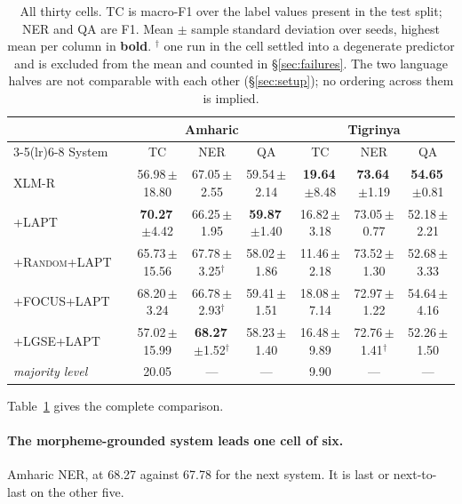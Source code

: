 \documentclass[11pt]{article}
\begin{document}
\begin{table}[t]
\centering
\small
\begin{tabular}{llcccccc}
\toprule
& & \multicolumn{3}{c}{\textbf{Amharic}} & \multicolumn{3}{c}{\textbf{Tigrinya}} \\
\cmidrule(lr){3-5}\cmidrule(lr){6-8}
System & & TC & NER & QA & TC & NER & QA \\
\midrule
XLM-R & & 56.98\,\small{$\pm$18.80} & 67.05\,\small{$\pm$2.55} & 59.54\,\small{$\pm$2.14} & \textbf{19.64}\,\small{$\pm$8.48} & \textbf{73.64}\,\small{$\pm$1.19} & \textbf{54.65}\,\small{$\pm$0.81} \\
\textsc{+LAPT} & & \textbf{70.27}\,\small{$\pm$4.42} & 66.25\,\small{$\pm$1.95} & \textbf{59.87}\,\small{$\pm$1.40} & 16.82\,\small{$\pm$3.18} & 73.05\,\small{$\pm$0.77} & 52.18\,\small{$\pm$2.21} \\
\textsc{+Random+LAPT} & & 65.73\,\small{$\pm$15.56} & 67.78\,\small{$\pm$3.25}$^\dagger$ & 58.02\,\small{$\pm$1.86} & 11.46\,\small{$\pm$2.18} & 73.52\,\small{$\pm$1.30} & 52.68\,\small{$\pm$3.33} \\
\textsc{+FOCUS+LAPT} & & 68.20\,\small{$\pm$3.24} & 66.78\,\small{$\pm$2.93}$^\dagger$ & 59.41\,\small{$\pm$1.51} & 18.08\,\small{$\pm$7.14} & 72.97\,\small{$\pm$1.22} & 54.64\,\small{$\pm$4.16} \\
\textsc{+LGSE+LAPT} & & 57.02\,\small{$\pm$15.99} & \textbf{68.27}\,\small{$\pm$1.52}$^\dagger$ & 58.23\,\small{$\pm$1.40} & 16.48\,\small{$\pm$9.89} & 72.76\,\small{$\pm$1.41}$^\dagger$ & 52.26\,\small{$\pm$1.50} \\
\midrule
\multicolumn{2}{l}{\emph{majority level}} & 20.05 & --- & --- & 9.90 & --- & --- \\
\bottomrule
\end{tabular}
\caption{All thirty cells. TC is macro-F1 over the label values present in
the test split; NER and QA are F1. Mean $\pm$ sample standard deviation over
seeds, highest mean per column in \textbf{bold}. $^\dagger$ one run in the
cell settled into a degenerate predictor and is excluded from the mean and
counted in \S\ref{sec:failures}. The two language halves are not comparable
with each other (\S\ref{sec:setup}); no ordering across them is implied.}
\label{tab:main}
\end{table}

Table~\ref{tab:main} gives the complete comparison.

\paragraph{The morpheme-grounded system leads one cell of six.} Amharic NER,
at 68.27 against 67.78 for the next system. It is last or next-to-last on the
other five.
\end{document}
